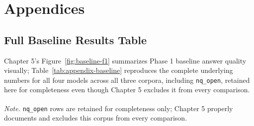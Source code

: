 \chapter*{Appendices}

\section*{Full Baseline Results Table}

Chapter 5's Figure~\ref{fig:baseline-f1} summarizes Phase 1 baseline
answer quality visually; Table~\ref{tab:appendix-baseline} reproduces
the complete underlying numbers for all four models across all three
corpora, including \texttt{nq\_open}, retained here for completeness
even though Chapter 5 excludes it from every comparison.

\begin{table}[htbp]
\centering
\renewcommand{\arraystretch}{1.2}
\caption{Complete Phase 1 baseline results, all model-corpus pairs, $n=1000$ each.}
\label{tab:appendix-baseline}
\vspace{4pt}
\begin{minipage}{0.95\linewidth}
\footnotesize
\textit{Note.} \textsuperscript{\dag}\texttt{nq\_open} rows are retained for completeness only; Chapter 5 properly documents and  excludes this corpus from every comparison.
\end{minipage}
\end{table}
\FloatBarrier

